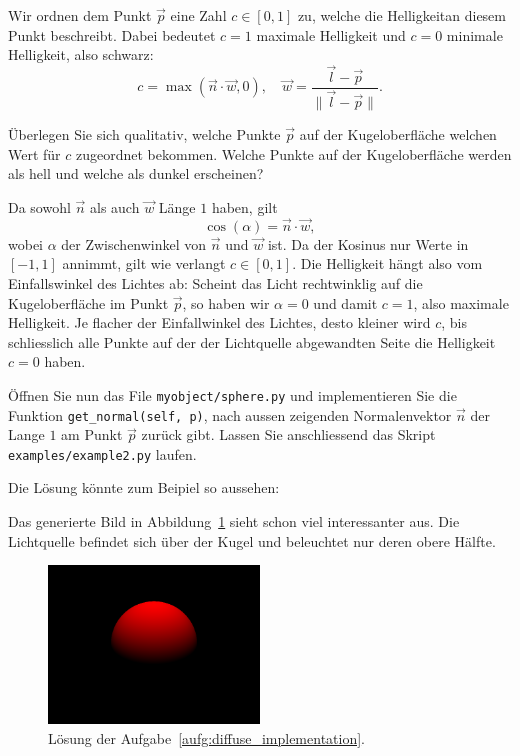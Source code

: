 Wir ordnen dem Punkt $\vec{p}$ eine Zahl $c\in\left[0,1\right]$ zu, welche die \glqq Helligkeit\grqq an diesem Punkt beschreibt.
Dabei bedeutet $c=1$ maximale Helligkeit und $c=0$ minimale Helligkeit, also schwarz:
\begin{equation}\label{eq:diffuse_coefficient}
	c=\max\left(\vec{n}\cdot\vec{w}, 0\right),\quad
	\vec{w}=\frac{\vec{l}-\vec{p}}{\lVert\vec{l}-\vec{p}\rVert}.
\end{equation}
\begin{aufgabe}\label{aufg:diffuse_coefficient}
	Überlegen Sie sich qualitativ, welche Punkte $\vec{p}$ auf der Kugeloberfläche welchen Wert für $c$ zugeordnet bekommen.
	Welche Punkte auf der Kugeloberfläche werden als \glqq hell\grqq{} und welche als \glqq dunkel\grqq{} erscheinen?
\end{aufgabe}
\begin{losung*}
	Da sowohl $\vec{n}$ als auch $\vec{w}$ Länge $1$ haben, gilt
	\begin{equation*}
		\cos\left(\alpha\right)=\vec{n}\cdot\vec{w},
	\end{equation*}
	wobei $\alpha$ der Zwischenwinkel von $\vec{n}$ und $\vec{w}$ ist.
	Da der Kosinus nur Werte in $\left[-1,1\right]$ annimmt, gilt wie verlangt $c\in\left[0,1\right]$.
	Die Helligkeit hängt also vom Einfallswinkel des Lichtes ab:
	Scheint das Licht rechtwinklig auf die Kugeloberfläche im Punkt $\vec{p}$, so haben wir $\alpha=0$ und damit $c=1$, also maximale Helligkeit.
	Je flacher der Einfallwinkel des Lichtes, desto kleiner wird $c$, bis schliesslich alle  Punkte auf der der Lichtquelle abgewandten Seite die Helligkeit $c=0$ haben.
\end{losung*}
\begin{aufgabe}\label{aufg:diffuse_implementation}
	Öffnen Sie nun das File \texttt{myobject/sphere.py} und implementieren Sie die Funktion \texttt{get\_normal(self, p)}, nach aussen zeigenden Normalenvektor $\vec{n}$ der Lange $1$ am Punkt $\vec{p}$ zurück gibt.
	Lassen Sie anschliessend das Skript \texttt{examples/example2.py} laufen.
\end{aufgabe}
\begin{losung*}
	Die Lösung könnte zum Beipiel so aussehen:
	
	Das generierte Bild in Abbildung~\ref{fig:solution_diffuse} sieht schon viel interessanter aus.
	Die Lichtquelle befindet sich über der Kugel und beleuchtet nur deren obere Hälfte.
	\begin{figure}[ht]
		\centering
		\includegraphics[width=0.5\textwidth]{images/example2.png}
		\caption{Lösung der Aufgabe~\ref{aufg:diffuse_implementation}.}
		\label{fig:solution_diffuse}
	\end{figure}
\end{losung*}